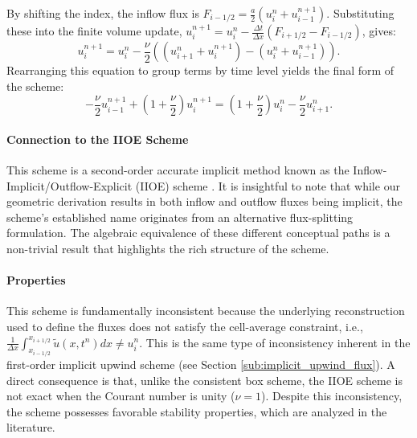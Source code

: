 By shifting the index, the inflow flux is \(F_{i-1/2} = \frac{a}{2}(u_i^n + u_{i-1}^{n+1})\). Substituting these into the finite volume update, \(u_i^{n+1} = u_i^n - \frac{\Delta t}{\Delta x}(F_{i+1/2} - F_{i-1/2})\), gives:
\begin{equation}
    u_i^{n+1} = u_i^n - \frac{\nu}{2}\left( (u_{i+1}^n + u_i^{n+1}) - (u_i^n + u_{i-1}^{n+1}) \right).
    \label{eq:iioe_scheme_simple}
\end{equation}
Rearranging this equation to group terms by time level yields the final form of the scheme:
\begin{equation}
    -\frac{\nu}{2}u_{i-1}^{n+1} + \left(1+\frac{\nu}{2}\right)u_i^{n+1} = \left(1+\frac{\nu}{2}\right)u_i^n - \frac{\nu}{2}u_{i+1}^n.
    \label{eq:iioe_scheme}
\end{equation}

\paragraph{Connection to the IIOE Scheme}
This scheme is a second-order accurate implicit method known as the Inflow-Implicit/Outflow-Explicit (IIOE) scheme \cite{2014_Mikula}. It is insightful to note that while our geometric derivation results in both inflow and outflow fluxes being implicit, the scheme's established name originates from an alternative flux-splitting formulation. The algebraic equivalence of these different conceptual paths is a non-trivial result that highlights the rich structure of the scheme.

\paragraph{Properties}
This scheme is fundamentally inconsistent because the underlying reconstruction used to define the fluxes does not satisfy the cell-average constraint, i.e., \(\frac{1}{\Delta x}\int_{x_{i-1/2}}^{x_{i+1/2}} \tilde{u}(x,t^n) dx \neq u_i^n\). This is the same type of inconsistency inherent in the first-order implicit upwind scheme (see Section \ref{sub:implicit_upwind_flux}). A direct consequence is that, unlike the consistent box scheme, the IIOE scheme is not exact when the Courant number is unity (\(\nu=1\)). Despite this inconsistency, the scheme possesses favorable stability properties, which are analyzed in the literature.

